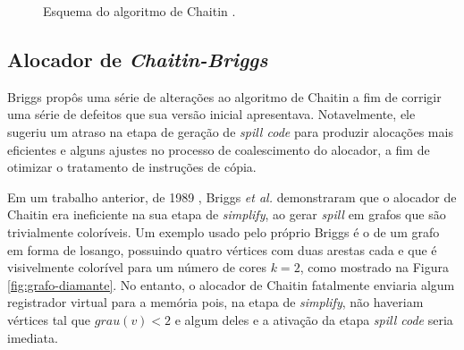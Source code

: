 \documentclass[
	12pt,				%
	openright,			%
	oneside,			%
	a4paper,			%
	tccpreliminar,			%
	]{ABNT-DC-UEL}
\begin{document}
\begin{figure}
    \centering
    \caption{Esquema do algoritmo de Chaitin \cite{chaitin:82}.}
    \label{fig:alocador-chaitin}
\end{figure}

\subsection{Alocador de \textit{Chaitin-Briggs}}

Briggs \cite{briggs:92} propôs uma série de alterações ao algoritmo de Chaitin a fim de corrigir uma série de defeitos que sua versão inicial apresentava. Notavelmente, ele sugeriu um atraso na etapa de geração de \textit{spill code} para produzir alocações mais eficientes e alguns ajustes no processo de coalescimento do alocador, a fim de otimizar o tratamento de instruções de cópia.

Em um trabalho anterior, de 1989 \cite{briggs:89}, Briggs \textit{et al.} demonstraram que o alocador de Chaitin era ineficiente na sua etapa de \textit{simplify}, ao gerar \textit{spill} em grafos que são trivialmente coloríveis. Um exemplo usado pelo próprio Briggs é o de um grafo em forma de losango, possuindo quatro vértices com duas arestas cada e que é visivelmente colorível para um número de cores $k=2$, como mostrado na Figura \ref{fig:grafo-diamante}. No entanto, o alocador de Chaitin fatalmente enviaria algum registrador virtual para a memória pois, na etapa de \textit{simplify}, não haveriam vértices tal que $\mathit{grau}(v)<2$ e algum deles e a ativação da etapa \textit{spill code} seria imediata.
\end{document}

